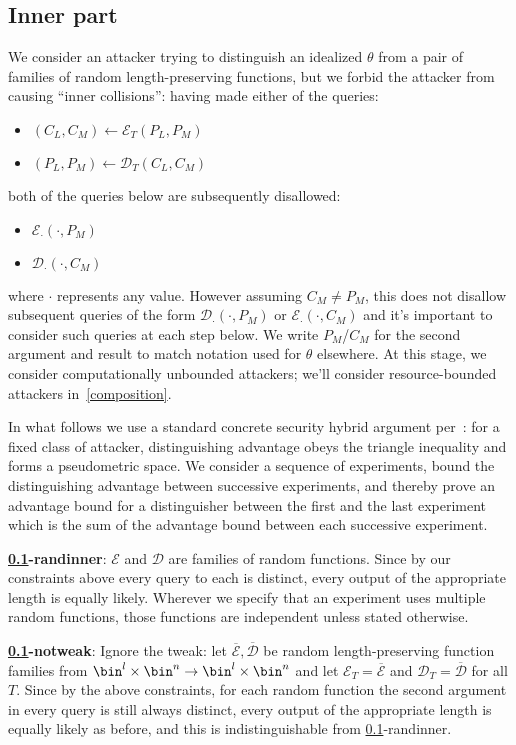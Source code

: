 \documentclass[journal=tosc,preprint,floatrow,submission]{iacrtrans}
\newcommand*{\xprm}[2]{\textsf{\ref*{#1}-#2}}
\newcommand*{\xprmtitle}[2]{\textbf{\xprm{#1}{#2}}}
\newcommand*{\calE}{\mathcal{E}}
\newcommand*{\calD}{\mathcal{D}}
\newcommand*{\barE}{\overline{\calE}}
\newcommand*{\barD}{\overline{\calD}}
\begin{document}
\subsection{Inner part}\label{innerpart}

We consider an attacker trying to distinguish an idealized $\theta$ from a
pair of families of random length-preserving functions,
but we forbid the attacker from causing ``inner collisions'':
having made either of the queries: \label{constraints}
\begin{itemize}
    \item $(C_L, C_M) \leftarrow \calE_T(P_L, P_M)$
    \item $(P_L, P_M) \leftarrow \calD_T(C_L, C_M)$
\end{itemize}
both of the queries below are subsequently disallowed:
\begin{itemize}
    \item $\calE_\cdotp(\cdotp, P_M)$
    \item $\calD_\cdotp(\cdotp, C_M)$
\end{itemize}
where $\cdotp$ represents any value. However assuming $C_M \neq P_M$, this does not disallow
subsequent queries of the form $\calD_\cdotp(\cdotp, P_M)$ or $\calE_\cdotp(\cdotp, C_M)$
and it's important to consider such queries at each step below. We write
$P_M$/$C_M$ for the second argument and result to match notation used for $\theta$ elsewhere.
At this stage, we consider computationally unbounded attackers; we'll consider resource-bounded
attackers in~\autoref{composition}.

In what follows we use a standard concrete security hybrid argument per~\cite{concrete,games}:
for a fixed class of attacker, distinguishing advantage obeys the triangle inequality and
forms a pseudometric space. We consider a
sequence of experiments, bound the distinguishing advantage between successive
experiments, and thereby
prove an advantage bound for a distinguisher between the first and the last experiment
which is the sum of the advantage bound between each successive experiment.

\xprmtitle{innerpart}{randinner}: $\calE$ and $\calD$ are families of
random functions. Since by our constraints above every query to each
is distinct, every output of the
appropriate length is equally likely. Wherever we specify that an experiment uses multiple random
functions, those functions are independent unless stated otherwise.

\xprmtitle{innerpart}{notweak}: Ignore the tweak: let
$\barE, \barD$ be random length-preserving function families from
$\bin^l \times \bin^n \rightarrow \bin^l \times \bin^n$
and let $\calE_T = \barE$ and $\calD_T = \barD$ for all $T$.
Since by the above constraints, for each random function the second argument in every query
is still always distinct, every output of the appropriate length is equally
likely as before, and this is indistinguishable from \xprm{innerpart}{randinner}.
\end{document}
